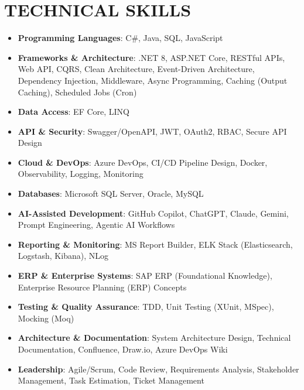 ﻿\documentclass[letterpaper,10pt]{article}
\newcommand{\resumeItem}[1]{\item\small{#1}}
\newcommand{\resumeSubHeadingList}{\begin{itemize}[leftmargin=0.15in, label={}]}
\newcommand{\resumeSubHeadingListEnd}{\end{itemize}}
\begin{document}
\section{TECHNICAL SKILLS}
\resumeSubHeadingList
  \resumeItem{\textbf{Programming Languages}: C\#, Java, SQL, JavaScript}
  \resumeItem{\textbf{Frameworks \& Architecture}: .NET 8, ASP.NET Core, RESTful APIs, Web API, CQRS, Clean Architecture, Event-Driven Architecture, Dependency Injection, Middleware, Async Programming, Caching (Output Caching), Scheduled Jobs (Cron)}
  \resumeItem{\textbf{Data Access}: EF Core, LINQ}
  \resumeItem{\textbf{API \& Security}: Swagger/OpenAPI, JWT, OAuth2, RBAC, Secure API Design}
  \resumeItem{\textbf{Cloud \& DevOps}: Azure DevOps, CI/CD Pipeline Design, Docker, Observability, Logging, Monitoring}
  \resumeItem{\textbf{Databases}: Microsoft SQL Server, Oracle, MySQL}
  \resumeItem{\textbf{AI-Assisted Development}: GitHub Copilot, ChatGPT, Claude, Gemini, Prompt Engineering, Agentic AI Workflows}
  \resumeItem{\textbf{Reporting \& Monitoring}: MS Report Builder, ELK Stack (Elasticsearch, Logstash, Kibana), NLog}
  \resumeItem{\textbf{ERP \& Enterprise Systems}: SAP ERP (Foundational Knowledge), Enterprise Resource Planning (ERP) Concepts}
  \resumeItem{\textbf{Testing \& Quality Assurance}: TDD, Unit Testing (XUnit, MSpec), Mocking (Moq)}
  \resumeItem{\textbf{Architecture \& Documentation}: System Architecture Design, Technical Documentation, Confluence, Draw.io, Azure DevOps Wiki}
  \resumeItem{\textbf{Leadership}: Agile/Scrum, Code Review, Requirements Analysis, Stakeholder Management, Task Estimation, Ticket Management}
\resumeSubHeadingListEnd
\end{document}
